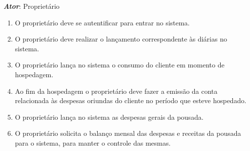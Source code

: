 \documentclass[a4paper,12pt]{article}
\begin{document}
\begin{center}
\end{center}
\textit{\textbf{Ator}}: Proprietário
\begin{enumerate}
\item O proprietário deve se autentificar para entrar no sistema.
\item O proprietário deve realizar o lançamento correspondente às diárias no sistema. 
\item O proprietário lança no sistema o consumo do cliente em momento de hospedagem. 
\item Ao fim da hospedagem o proprietário deve fazer a emissão da conta relacionada às despesas oriundas do cliente no período que esteve hospedado. 
\item O proprietário lança no sistema as despesas gerais da pousada. 
\item O proprietário solicita o balanço mensal das despesas e receitas da pousada para o sistema, para manter o controle das mesmas. 
\end{enumerate}

\newpage
\end{document}
